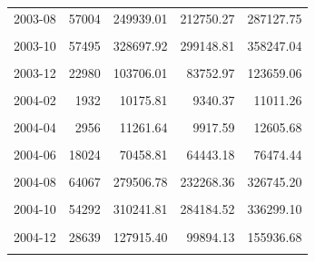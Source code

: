 \begin{longtable}[t]{crrrr}
2003-08 & 57004 & 249939.01 & 212750.27 & 287127.75\\
\cellcolor{gray!10}{2003-09} & \cellcolor{gray!10}{97758} & \cellcolor{gray!10}{463904.12} & \cellcolor{gray!10}{423115.41} & \cellcolor{gray!10}{504692.84}\\
2003-10 & 57495 & 328697.92 & 299148.81 & 358247.04\\
\cellcolor{gray!10}{2003-11} & \cellcolor{gray!10}{35421} & \cellcolor{gray!10}{165037.73} & \cellcolor{gray!10}{129560.32} & \cellcolor{gray!10}{200515.13}\\
2003-12 & 22980 & 103706.01 & 83752.97 & 123659.06\\
\cellcolor{gray!10}{2004-01} & \cellcolor{gray!10}{3883} & \cellcolor{gray!10}{20256.65} & \cellcolor{gray!10}{17606.42} & \cellcolor{gray!10}{22906.87}\\
2004-02 & 1932 & 10175.81 & 9340.37 & 11011.26\\
\cellcolor{gray!10}{2004-03} & \cellcolor{gray!10}{2928} & \cellcolor{gray!10}{11900.02} & \cellcolor{gray!10}{10779.96} & \cellcolor{gray!10}{13020.08}\\
2004-04 & 2956 & 11261.64 & 9917.59 & 12605.68\\
\cellcolor{gray!10}{2004-05} & \cellcolor{gray!10}{6609} & \cellcolor{gray!10}{24976.59} & \cellcolor{gray!10}{22725.62} & \cellcolor{gray!10}{27227.56}\\
2004-06 & 18024 & 70458.81 & 64443.18 & 76474.44\\
\cellcolor{gray!10}{2004-07} & \cellcolor{gray!10}{30356} & \cellcolor{gray!10}{86244.32} & \cellcolor{gray!10}{48170.26} & \cellcolor{gray!10}{124318.39}\\
2004-08 & 64067 & 279506.78 & 232268.36 & 326745.20\\
\cellcolor{gray!10}{2004-09} & \cellcolor{gray!10}{121395} & \cellcolor{gray!10}{567266.60} & \cellcolor{gray!10}{506496.85} & \cellcolor{gray!10}{628036.35}\\
2004-10 & 54292 & 310241.81 & 284184.52 & 336299.10\\
\cellcolor{gray!10}{2004-11} & \cellcolor{gray!10}{45364} & \cellcolor{gray!10}{209938.40} & \cellcolor{gray!10}{154848.62} & \cellcolor{gray!10}{265028.17}\\
2004-12 & 28639 & 127915.40 & 99894.13 & 155936.68\\
\cellcolor{gray!10}{2005-01} & \cellcolor{gray!10}{7057} & \cellcolor{gray!10}{35143.86} & \cellcolor{gray!10}{26477.22} & \cellcolor{gray!10}{43810.50}\\

\end{longtable}
